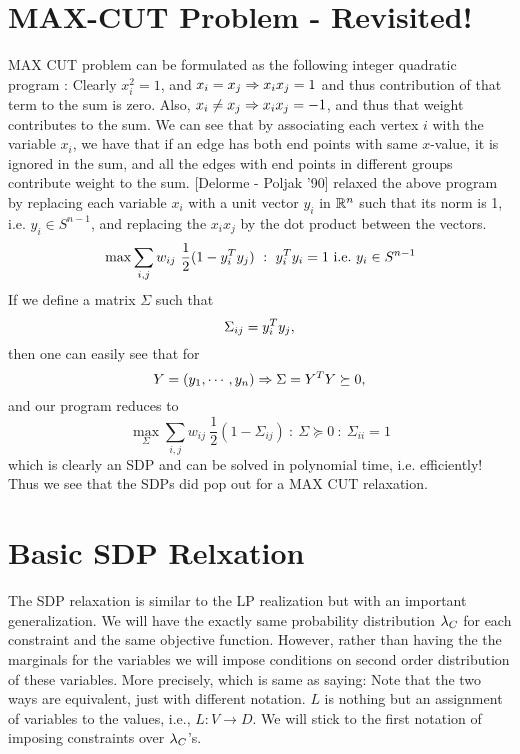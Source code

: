 \section{MAX-CUT Problem - Revisited!}

MAX CUT problem can be formulated as the following integer quadratic program : 
Clearly $x_i^2=1$, and $x_i=x_j\Rightarrow x_ix_j=1$ and thus contribution of that term to the sum is zero. 
Also, $x_i \neq x_j \Rightarrow x_ix_j=-1$, and thus that weight contributes to the sum. 
We can see that by associating each vertex $i$ with the variable $x_i$, we have that if an edge has both end points with same $x$-value, it is ignored in the sum, and all the edges with end points in different groups contribute weight to the sum. 
[Delorme - Poljak '90] relaxed the above program by replacing each variable $x_i$ with a unit vector $y_i$ in $\mathbb{R}^n$ such that its norm is 1, i.e. $y_i \in S^{n-1}$, and replacing the $x_ix_j$ by the dot product between the vectors. 
\[ \max \sum_{i,j} w_{ij} \ \frac{1}{2}(1-y_i^T y_j) ~:~ y_i^T y_i = 1 {\mbox {\ i.e.\ }} y_i \in S^{n-1} \]
If we define a matrix $\Sigma$ such that $$\Sigma_{ij} = y_i^T y_j,$$ then one can easily see that for $$Y = (y_1, \cdots, y_n) \Rightarrow \Sigma = Y^T Y \succeq 0,$$ and our program reduces to 
\[ \max_\Sigma \sum_{i,j} w_{ij} \ \frac{1}{2}(1-\Sigma_{ij}) ~:~ \Sigma \succeq 0 ~:~ \Sigma_{ii} = 1  \]
which is clearly an SDP and can be solved in polynomial time, i.e. efficiently! 
Thus we see that the SDPs did pop out for a MAX CUT relaxation.

\section{Basic SDP Relxation}

The SDP relaxation is similar to the LP realization but with an important generalization. 
We will have the exactly same probability distribution $\lambda_C$ for each constraint and the same objective function. 
However, rather than having the the marginals for the variables we will impose conditions on second order distribution of these variables. 
More precisely,
which is same as saying: 
Note that the two ways are equivalent, just with different notation. 
$L$ is nothing but an assignment of variables to the values, i.e., $L : V \rightarrow D$. 
We will stick to the first notation of imposing constraints over $\lambda_C$'s. 

